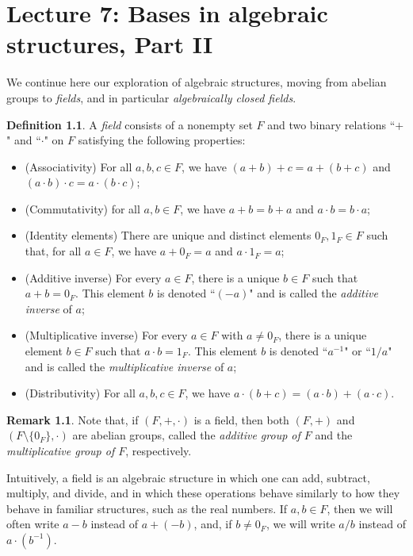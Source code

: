 \documentclass[a4paper]{memoir}
\theoremstyle{definition}
\newtheorem{definition}[theorem]{Definition}
\newtheorem{remark}[theorem]{Remark}
\begin{document}
\chapter{Lecture 7: Bases in algebraic structures, Part II} \label{chapter_7}

We continue here our exploration of algebraic structures, moving from abelian groups to 
\emph{fields}, and in particular \emph{algebraically closed fields}.

\begin{definition} \label{def: field}
  A \emph{field} consists of a nonempty set $F$ and two binary relations ``$+$" and 
  ``$\cdot$" on $F$ satisfying the following properties:
  \begin{itemize}
    \item (Associativity) For all $a,b,c \in F$, we have $(a + b) + c = a + (b + c)$ 
    and $(a \cdot b) \cdot c = a \cdot (b \cdot c)$;
    \item (Commutativity) for all $a,b \in F$, we have $a + b = b + a$ and $a \cdot b = 
    b \cdot a$;
    \item (Identity elements) There are unique and distinct elements $0_F, 1_F \in F$ such that, for all 
    $a \in F$, we have $a + 0_F = a$ and $a \cdot 1_F = a$;
    \item (Additive inverse) For every $a \in F$, there is a unique $b \in F$ such that 
    $a + b = 0_F$. This element $b$ is denoted ``$(-a)$" and is called the 
    \emph{additive inverse} of $a$;
    \item (Multiplicative inverse) For every $a \in F$ with $a \neq 0_F$, there is a 
    unique element $b \in F$ such that $a \cdot b = 1_F$. This element $b$ is denoted 
    ``$a^{-1}$" or ``$1/a$" and is called the \emph{multiplicative inverse} of $a$;
    \item (Distributivity) For all $a,b,c \in F$, we have $a \cdot (b + c) = (a \cdot b) 
    + (a \cdot c)$.
  \end{itemize}
\end{definition}

\begin{remark}
  Note that, if $(F, +, \cdot)$ is a field, then both $(F, +)$ and \\ $(F \setminus \{0_F\}, 
  \cdot)$ are abelian groups, called the \emph{additive group of $F$} and the \emph{multiplicative 
  group of $F$}, respectively.
\end{remark}

Intuitively, a field is an algebraic structure in which one can add, subtract, multiply, 
and divide, and in which these operations behave similarly to how they behave in familiar 
structures, such as the real numbers. If $a,b \in F$, then we will often write 
$a-b$ instead of $a + (-b)$, and, if $b \neq 0_F$, we will write $a/b$ instead of 
$a \cdot (b^{-1})$.
\end{document}
